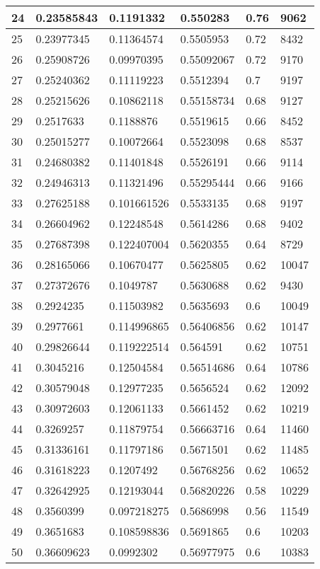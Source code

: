 \begin{longtable}{|l|l|l|l|l|l|}
24 & 0.23585843 & 0.1191332 & 0.550283 & 0.76 & 9062 \\ \hline 
25 & 0.23977345 & 0.11364574 & 0.5505953 & 0.72 & 8432 \\ \hline 
26 & 0.25908726 & 0.09970395 & 0.55092067 & 0.72 & 9170 \\ \hline 
27 & 0.25240362 & 0.11119223 & 0.5512394 & 0.7 & 9197 \\ \hline 
28 & 0.25215626 & 0.10862118 & 0.55158734 & 0.68 & 9127 \\ \hline 
29 & 0.2517633 & 0.1188876 & 0.5519615 & 0.66 & 8452 \\ \hline 
30 & 0.25015277 & 0.10072664 & 0.5523098 & 0.68 & 8537 \\ \hline 
31 & 0.24680382 & 0.11401848 & 0.5526191 & 0.66 & 9114 \\ \hline 
32 & 0.24946313 & 0.11321496 & 0.55295444 & 0.66 & 9166 \\ \hline 
33 & 0.27625188 & 0.101661526 & 0.5533135 & 0.68 & 9197 \\ \hline 
34 & 0.26604962 & 0.12248548 & 0.5614286 & 0.68 & 9402 \\ \hline 
35 & 0.27687398 & 0.122407004 & 0.5620355 & 0.64 & 8729 \\ \hline 
36 & 0.28165066 & 0.10670477 & 0.5625805 & 0.62 & 10047 \\ \hline 
37 & 0.27372676 & 0.1049787 & 0.5630688 & 0.62 & 9430 \\ \hline 
38 & 0.2924235 & 0.11503982 & 0.5635693 & 0.6 & 10049 \\ \hline 
39 & 0.2977661 & 0.114996865 & 0.56406856 & 0.62 & 10147 \\ \hline 
40 & 0.29826644 & 0.119222514 & 0.564591 & 0.62 & 10751 \\ \hline 
41 & 0.3045216 & 0.12504584 & 0.56514686 & 0.64 & 10786 \\ \hline 
42 & 0.30579048 & 0.12977235 & 0.5656524 & 0.62 & 12092 \\ \hline 
43 & 0.30972603 & 0.12061133 & 0.5661452 & 0.62 & 10219 \\ \hline 
44 & 0.3269257 & 0.11879754 & 0.56663716 & 0.64 & 11460 \\ \hline 
45 & 0.31336161 & 0.11797186 & 0.5671501 & 0.62 & 11485 \\ \hline 
46 & 0.31618223 & 0.1207492 & 0.56768256 & 0.62 & 10652 \\ \hline 
47 & 0.32642925 & 0.12193044 & 0.56820226 & 0.58 & 10229 \\ \hline 
48 & 0.3560399 & 0.097218275 & 0.5686998 & 0.56 & 11549 \\ \hline 
49 & 0.3651683 & 0.108598836 & 0.5691865 & 0.6 & 10203 \\ \hline 
50 & 0.36609623 & 0.0992302 & 0.56977975 & 0.6 & 10383 \\ \hline 
\end{longtable}